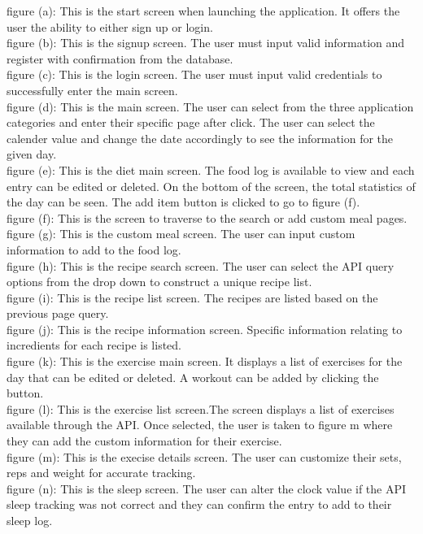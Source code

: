 \documentclass[12pt, titlepage]{article}
\begin{document}
	figure (a): This is the start screen when launching the application. It offers the user the ability to either sign up or login.
	\\figure (b): This is the signup screen. The user must input valid information and register with confirmation from the database.
	\\figure (c): This is the login screen. The user must input valid credentials to successfully enter the main screen.
	\\figure (d): This is the main screen. The user can select from the three application categories and enter their specific page after click. The user can select the calender value and change the date accordingly to see the information for the given day.
	\\figure (e): This is the diet main screen. The food log is available to view and each entry can be edited or deleted. On the bottom of the screen, the total statistics of the day can be seen. The add item button is clicked to go to figure (f).
	\\figure (f): This is the screen to traverse to the search or add custom meal pages.
	\\figure (g): This is the custom meal screen. The user can input custom information to add to the food log.
	\\figure (h): This is the recipe search screen. The user can select the API query options from the drop down to construct a unique recipe list.
	\\figure (i): This is the recipe list screen. The recipes are listed based on the previous page query. 
	\\figure (j): This is the recipe information screen. Specific information relating to incredients for each recipe is listed.
	\\figure (k): This is the exercise main screen. It displays a list of exercises for the day that can be edited or deleted. A workout can be added by clicking the button.
	\\figure (l): This is the exercise list screen.The screen displays a list of exercises available through the API. Once selected, the user is taken to figure m where they can add the custom information for their exercise. 
	\\figure (m): This is the execise details screen. The user can customize their sets, reps and weight for accurate tracking.
	\\figure (n): This is the sleep screen. The user can alter the clock value if the API sleep tracking was not correct and they can confirm the entry to add to their sleep log. 
	
\end{document}

